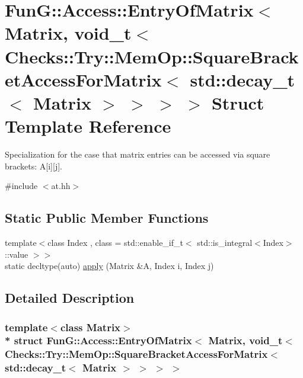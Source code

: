 \hypertarget{structFunG_1_1Access_1_1EntryOfMatrix_3_01Matrix_00_01void__t_3_01Checks_1_1Try_1_1MemOp_1_1Squa64f8314119f1d5e2cd3b3016365cec8d}{}\section{FunG\+:\+:Access\+:\+:Entry\+Of\+Matrix$<$ Matrix, void\+\_\+t$<$ Checks\+:\+:Try\+:\+:Mem\+Op\+:\+:Square\+Bracket\+Access\+For\+Matrix$<$ std\+:\+:decay\+\_\+t$<$ Matrix $>$ $>$ $>$ $>$ Struct Template Reference}
\label{structFunG_1_1Access_1_1EntryOfMatrix_3_01Matrix_00_01void__t_3_01Checks_1_1Try_1_1MemOp_1_1Squa64f8314119f1d5e2cd3b3016365cec8d}


Specialization for the case that matrix entries can be accessed via square brackets\+: A\mbox{[}i\mbox{]}\mbox{[}j\mbox{]}.  




{\ttfamily \#include $<$at.\+hh$>$}

\subsection*{Static Public Member Functions}
\begin{DoxyCompactItemize}
\item 
{\footnotesize template$<$class Index , class  = std\+::enable\+\_\+if\+\_\+t$<$ std\+::is\+\_\+integral$<$\+Index$>$\+::value $>$$>$ }\\static decltype(auto) \hyperlink{structFunG_1_1Access_1_1EntryOfMatrix_3_01Matrix_00_01void__t_3_01Checks_1_1Try_1_1MemOp_1_1Squa64f8314119f1d5e2cd3b3016365cec8d_a58ce3dc742bfcd47dd9d7f048b9488cd}{apply} (Matrix \&A, Index i, Index j)
\end{DoxyCompactItemize}


\subsection{Detailed Description}
\subsubsection*{template$<$class Matrix$>$\\*
struct Fun\+G\+::\+Access\+::\+Entry\+Of\+Matrix$<$ Matrix, void\+\_\+t$<$ Checks\+::\+Try\+::\+Mem\+Op\+::\+Square\+Bracket\+Access\+For\+Matrix$<$ std\+::decay\+\_\+t$<$ Matrix $>$ $>$ $>$ $>$}

